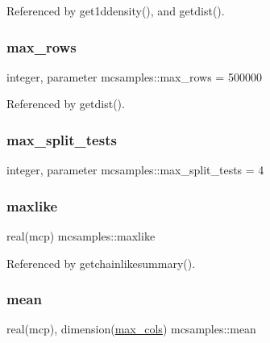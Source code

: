 Referenced by get1ddensity(), and getdist().

\mbox{\label{namespacemcsamples_a11a673041be4c2131b8dc7a2806e6a04}} 
\subsubsection{\texorpdfstring{max\+\_\+rows}{max\_rows}}
{\footnotesize\ttfamily integer, parameter mcsamples\+::max\+\_\+rows = 500000}



Referenced by getdist().

\mbox{\label{namespacemcsamples_aecb93fc58e3823802a4eabc86659a889}} 
\subsubsection{\texorpdfstring{max\+\_\+split\+\_\+tests}{max\_split\_tests}}
{\footnotesize\ttfamily integer, parameter mcsamples\+::max\+\_\+split\+\_\+tests = 4}

\mbox{\label{namespacemcsamples_a084bb79be779410b498f439e52a95c5e}} 
\subsubsection{\texorpdfstring{maxlike}{maxlike}}
{\footnotesize\ttfamily real(mcp) mcsamples\+::maxlike}



Referenced by getchainlikesummary().

\mbox{\label{namespacemcsamples_a770892813dc80f66c4a9d4af5df91a26}} 
\subsubsection{\texorpdfstring{mean}{mean}}
{\footnotesize\ttfamily real(mcp), dimension(\mbox{\hyperlink{namespacemcsamples_ae8386bad918d8af8d203683c01d5818c}{max\+\_\+cols}}) mcsamples\+::mean}



